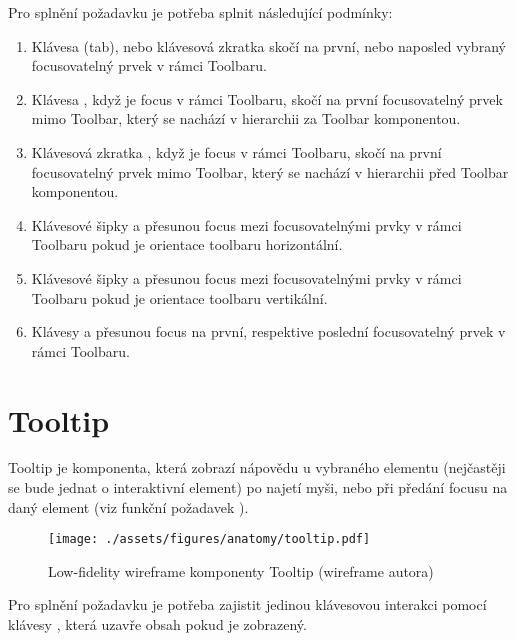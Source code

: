 Pro splnění požadavku \hyperref[ofr11]{} je potřeba splnit následující podmínky:

\begin{enumerate}
    \item Klávesa \keys{\tab} (tab), nebo klávesová zkratka \keys{\tab + \shift} skočí na první, nebo naposled vybraný focusovatelný prvek v rámci Toolbaru.
    \item Klávesa \keys{\tab}, když je focus v rámci Toolbaru, skočí na první focusovatelný prvek mimo Toolbar, který se nachází v hierarchii za Toolbar komponentou.
    \item Klávesová zkratka \keys{\tab + \shift}, když je focus v rámci Toolbaru, skočí na první focusovatelný prvek mimo Toolbar, který se nachází v hierarchii před Toolbar komponentou.
    \item Klávesové šipky \keys{\arrowkeyleft} a \keys{\arrowkeyright} přesunou focus mezi focusovatelnými prvky v rámci Toolbaru pokud je orientace toolbaru horizontální.
    \item Klávesové šipky \keys{\arrowkeyup} a \keys{\arrowkeydown} přesunou focus mezi focusovatelnými prvky v rámci Toolbaru pokud je orientace toolbaru vertikální.
    \item Klávesy  a  přesunou focus na první, respektive poslední focusovatelný prvek v rámci Toolbaru.
\end{enumerate}

\section{Tooltip}

Tooltip je komponenta, která zobrazí nápovědu u vybraného elementu (nejčastěji se bude jednat o interaktivní element) po najetí myši, nebo při předání focusu na daný element (viz funkční požadavek \hyperref[tlfr11]{}).

\begin{figure}[htp]
    \centering
    \texttt{[image: ./assets/figures/anatomy/tooltip.pdf]}
    \captionsetup{justification=centering}
    \caption[Low-fidelity wireframe komponenty Tooltip]{Low-fidelity wireframe komponenty Tooltip (wireframe autora)}
\end{figure}

Pro splnění požadavku \hyperref[ofr11]{} je potřeba zajistit jedinou klávesovou interakci pomocí klávesy \keys{\esc}, která uzavře obsah pokud je zobrazený.

